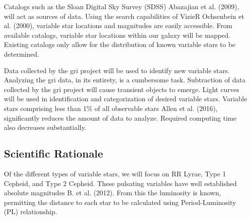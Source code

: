 \documentclass[letterpaper,11pt]{article}
\begin{document}
Catalogs such as the Sloan Digital Sky Survey (SDSS) Abazajian et al. (2009), will act as sources of data.  Using the search capabilities of VizieR Ochsenbein et al. (2000), variable star locations and magnitudes are easily accessible.  From available catalogs, variable star locations within our galaxy will be mapped.  Existing catalogs only allow for the distribution of known variable stars to be determined.



Data collected by the gri project will be used to identify new variable stars.
Analyzing the gri data, in its entirety, is a cumbersome task.  Subtraction of data collected by the gri project will cause transient objects to emerge.  
Light curves will be used in identification and categorization of desired variable stars.
Variable stars comprising less than 1\% of all observable stars Allen et al. (2016), significantly reduces the amount of data to analyze.  Required computing time also decreases substantially.


\subsection{Scientific Rationale}
Of the different types of variable stars, we will focus on RR Lyrae, Type 1 Cepheid, and Type 2 Cepheid.  These pulsating variables have well established absolute magnitudes B. et al. (2012).  From this the luminosity is known, permitting the distance to each star to be calculated using Period-Luminosity (PL) relationship.
\end{document}
